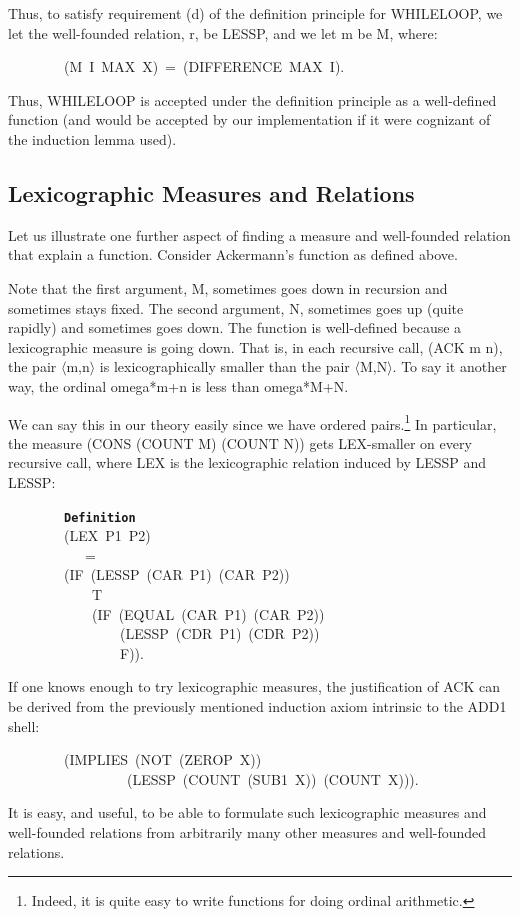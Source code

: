\documentclass[11pt]{book}
\newenvironment{pubasis}{\begin{flushleft}\ttfamily\small}{\normalsize\rmfamily\end{flushleft}}
\newcommand{\axiomordefinition}[1]{\vspace{6pt}\texttt{\textbf{#1}}}
\newcommand{\pubdefaulttextsize}{\large}
\begin{document}
Thus, to satisfy requirement (d)
of the definition principle for WHILELOOP, we let the well-founded relation, r, be
LESSP, and we let m be M, where:
\begin{pubasis}
~~~~~~~~(M~I~MAX~X)~=~(DIFFERENCE~MAX~I).\\
\end{pubasis}
Thus, WHILELOOP is accepted under the definition principle as a well-defined
function (and would be accepted by our implementation if it were cognizant
of the induction lemma used).
\subsection{Lexicographic Measures and Relations}
\pubdefaulttextsize
Let us illustrate one further aspect of finding a measure and well-founded relation that
explain a function.  Consider Ackermann's function as defined
above.

Note that the first argument, M, sometimes goes down in recursion and sometimes
stays fixed.  The second argument, N, sometimes goes up (quite rapidly) and
sometimes goes down.  The function is well-defined because
a lexicographic measure is going down.  That is, in each recursive
call, (ACK m n), the pair $\langle$m,n$\rangle$ is lexicographically smaller than
the pair $\langle$M,N$\rangle$.
To say it another way, the ordinal omega*m+n is less than omega*M+N.

We can say this in our theory  easily since we have ordered pairs.\footnote{Indeed, it is quite easy to write  functions for doing ordinal arithmetic.}  In particular,
the measure (CONS (COUNT M) (COUNT N)) gets LEX-smaller on every recursive call, where
LEX is the lexicographic relation induced by LESSP and LESSP:
\begin{pubasis}
~~~~~~~~\axiomordefinition{Definition}\\
~~~~~~~~(LEX~P1~P2)\\
~~~~~~~~~~~=\\
~~~~~~~~(IF~(LESSP~(CAR~P1)~(CAR~P2))\\
~~~~~~~~~~~~T\\
~~~~~~~~~~~~(IF~(EQUAL~(CAR~P1)~(CAR~P2))\\
~~~~~~~~~~~~~~~~(LESSP~(CDR~P1)~(CDR~P2))\\
~~~~~~~~~~~~~~~~F)).\\
\end{pubasis}
If one knows enough to try lexicographic measures,
the justification of ACK can be derived from the previously
mentioned induction axiom intrinsic to the ADD1 shell:
\begin{pubasis}
~~~~~~~~(IMPLIES~(NOT~(ZEROP~X))\\
~~~~~~~~~~~~~~~~~(LESSP~(COUNT~(SUB1~X))~(COUNT~X))).\\
\end{pubasis}
It is easy, and useful, to be able to formulate such lexicographic
measures and well-founded relations from arbitrarily many other measures
and well-founded relations.
\end{document}
